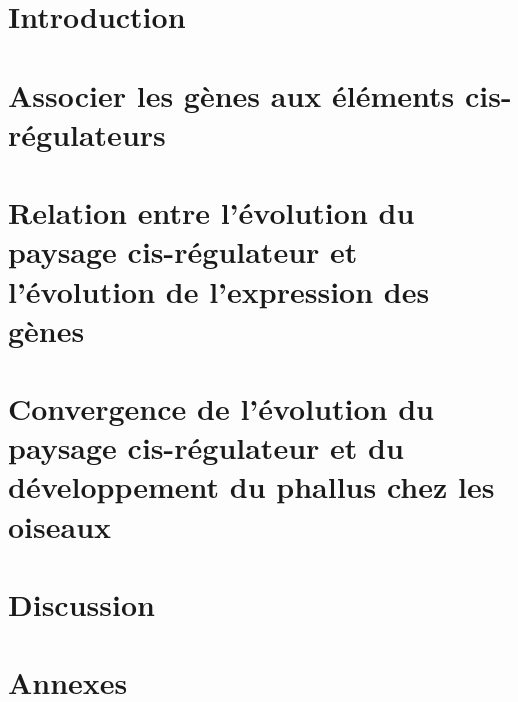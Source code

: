 \documentclass[a4paper,oneside,nobind]{thesis}
\begin{document}
    \part{Introduction}
    \label{part:intro}
    
    
    
    
    
    \part{Associer les gènes aux éléments cis-régulateurs}
    \label{part:chap2}
    

    \part{Relation entre l’évolution du paysage cis-régulateur et l’évolution de l’expression des gènes}
    \label{part:chap3}
    
    
    \part{Convergence de l’évolution du paysage cis-régulateur et du développement du phallus chez les oiseaux}
    \label{part:chap4}
    
    
    \part{Discussion}
    \label{part:discussion}
    

    \part{Annexes}
    


    \thispagestyle{empty}
    
    
\end{document}
